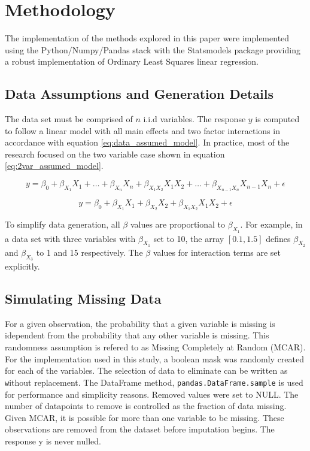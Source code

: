 \documentclass[../paper.tex]{subfiles}
\begin{document}
\section{Methodology}
The implementation of the methods explored in this paper were implemented using
the Python/Numpy/Pandas stack with the Statsmodels package providing a robust
implementation of Ordinary Least Squares linear regression.


\subsection{Data Assumptions and Generation Details}
The data set must be comprised of $n$ i.i.d variables. The response $y$ is computed
to follow a linear model with all main effects and two factor interactions
in accordance with equation \ref{eq:data_assumed_model}. In practice, most of
the research focused on the two variable case shown in equation \ref{eq:2var_assumed_model}.

\begin{equation}\label{eq:data_assumed_model}
y = \beta_{0} + \beta_{ X_{1} } X_{1}  + \ldots + \beta_{X_{n}}X_{n} +
\beta_{X_{1}X_{2}}X_{1}X_{2} + \ldots +\beta_{X_{n-1}X_{n}}X_{n-1}X_{n} + \epsilon
\end{equation}


\begin{equation}\label{eq:2var_assumed_model}
y = \beta_{0} + \beta_{ X_{1}} X_{1} + \beta_{X_{2} }X_{2} + \beta_{ X_{1} X_{2} } X_{1}X_{2} + \epsilon
\end{equation}

To simplify data generation, all $\beta$ values are proportional to $\beta_{X_{1}}$.
For example, in a data set with three variables with $\beta_{X_{1}}$ set to 10, the array
$[0.1, 1.5]$ defines $\beta_{X_{2}}$ and $\beta_{X_{3}}$ to 1 and 15 respectively.
The $\beta$ values for interaction terms are set explicitly.

\subsection{Simulating Missing Data}
For a given observation, the probability that a given variable is missing is
idependent from the probability that any other variable is missing. This randomness
assumption is refered to as Missing Completely at Random (MCAR). For the implementation
used in this study, a boolean mask was randomly created for each
of the variables. The selection of data to eliminate can be written as
\texttt without replacement.
The DataFrame method, \texttt{pandas.DataFrame.sample} is used for
performance and simplicity reasons. Removed values were set to NULL. The number of
datapoints to remove is controlled as the fraction of data missing. Given MCAR,
it is possible for more than one variable to be missing. These observations are
removed from the dataset before imputation begins. The response y is never
nulled.
\end{document}

